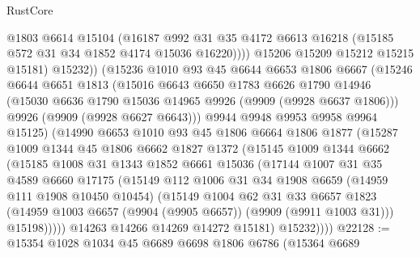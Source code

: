 \begin{lexlean}{RustCore}
\begin{coremodule}
                  @1803
                  @6614
                  @15104
                  (@16187
                    @992
                    @31
                    @35
                    @4172
                    @6613
                    @16218
                    (@15185 @572 @31 @34 @1852 @4174 @15036 @16220))))
              @15206
              @15209
              @15212
              @15215
              @15181)
            @15232))
        (@15236
          @1010
          @93
          @45
          @6644
          @6653
          @1806
          @6667
          (@15246
            @6644
            @6651
            @1813
            (@15016
              @6643
              @6650
              @1783
              @6626
              @1790
              @14946
              (@15030 @6636 @1790 @15036 @14965 @9926 (@9909 (@9928 @6637 @1806)))
              @9926
              (@9909 (@9928 @6627 @6643)))
            @9944
            @9948
            @9953
            @9958
            @9964
            @15125)
          (@14990
            @6653
            @1010
            @93
            @45
            @1806
            @6664
            @1806
            @1877
            (@15287
              @1009
              @1344
              @45
              @1806
              @6662
              @1827
              @1372
              (@15145
                @1009
                @1344
                @6662
                (@15185
                  @1008
                  @31
                  @1343
                  @1852
                  @6661
                  @15036
                  (@17144
                    @1007
                    @31
                    @35
                    @4589
                    @6660
                    @17175
                    (@15149
                      @112
                      @1006
                      @31
                      @34
                      @1908
                      @6659
                      (@14959 @111 @1908 @10450 @10454)
                      (@15149
                        @1004
                        @62
                        @31
                        @33
                        @6657
                        @1823
                        (@14959 @1003 @6657 (@9904 (@9905 @6657)) (@9909 (@9911 @1003 @31)))
                        @15198)))))
              @14263
              @14266
              @14269
              @14272
              @15181)
            @15232))))
@22128 := @15354
    @1028
    @1034
    @45
    @6689
    @6698
    @1806
    @6786
    (@15364
      @6689

\end{coremodule}
\end{lexlean}
